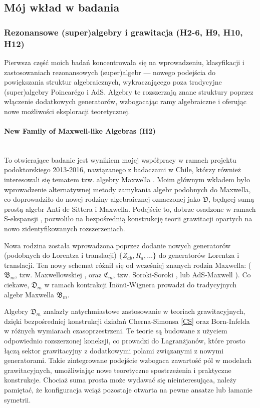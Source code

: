 \documentclass[12pt,a4paper]{article}
\newcommand{\myparagraph}[1]{\paragraph{#1}\mbox{}\\}
\begin{document}
\subsection{Mój wkład w badania}

\subsubsection{Rezonansowe (super)algebry i grawitacja (H2-6, H9, H10, H12)}

Pierwsza część moich badań koncentrowała się na wprowadzeniu, klasyfikacji i zastosowaniach rezonansowych (super)algebr — nowego podejścia do powiększania struktur algebraicznych, wykraczającego poza tradycyjne (super)algebry Poincarégo i AdS. Algebry te rozszerzają znane struktury poprzez włączenie dodatkowych generatorów, wzbogacając ramy algebraiczne i oferując nowe możliwości eksploracji teoretycznej. 

\myparagraph{New Family of Maxwell-like Algebras (H2)}

To otwierające badanie jest wynikiem mojej współpracy w ramach projektu podoktorskiego 2013-2016, nawiązanego z badaczami w Chile, którzy również interesowali się tematem tzw. algebry Maxwella \cite{Bacry:1970ye, Schrader:1972zd}. Moim głównym wkładem było wprowadzenie alternatywnej metody zamykania algebr podobnych do Maxwella, co doprowadziło do nowej rodziny algebraicznej oznaczonej jako $\mathfrak{D}$, będącej sumą prostą algebr Anti-de Sittera i Maxwella. Podejście to, dobrze osadzone w ramach S-ekspansji \cite{Izaurieta:2006zz}, pozwoliło na bezpośrednią konstrukcję teorii grawitacji opartych na nowo zidentyfikowanych rozszerzeniach.

Nowa rodzina została wprowadzona poprzez dodanie nowych generatorów (podobnych do Lorentza i translacji) $\{ Z_{ab}, R_{a}, \ldots \}$ do generatorów Lorentza i translacji. Ten nowy schemat różnił się od wcześniej znanych rodzin Maxwella: ($\mathfrak{B}_m$, tzw. Maxwellowskiej \cite{Bacry:1970ye, Schrader:1972zd}, oraz $\mathfrak{C}_m$, tzw. Soroki-Soroki \cite{Soroka:2006aj, Soroka:2011tc, Salgado:2013eut}, lub AdS-Maxwell \cite{Durka:2011nf}). Co ciekawe, $\mathfrak{D}_m$ w ramach kontrakcji Inönü-Wignera prowadzi do tradycyjnych algebr Maxwella $\mathfrak{B}_m$.

Algebry $\mathfrak{D}_m$ znalazły natychmiastowe zastosowanie w teoriach grawitacyjnych, dzięki bezpośredniej konstrukcji działań Cherna-Simonsa \eqref{CS} oraz Born-Infelda \cite{Concha:2014vka} w różnych wymiarach czasoprzestrzeni. Te teorie są budowane z użyciem odpowiednio rozszerzonej koneksji, co prowadzi do Lagranżjanów, które prosto łączą sektor grawitacyjny z dodatkowymi polami związanymi z nowymi generatorami. Takie zintegrowane podejście wzbogaca zawartość pól w modelach grawitacyjnych, umożliwiając nowe teoretyczne spostrzeżenia i praktyczne konstrukcje. Chociaż suma prosta może wydawać się nieinteresująca, należy pamiętać, że konfiguracja wciąż pozostaje otwarta na pewne ansatze lub łamanie symetrii.
\end{document}
